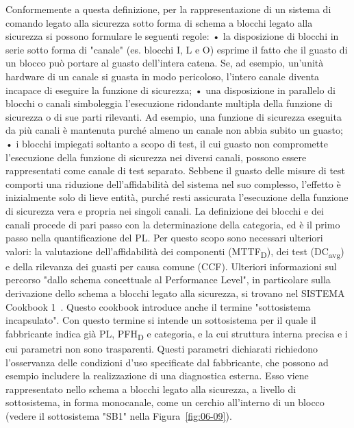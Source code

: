 \begin{center}
    \begin{minipage}{\textwidth}
        \centering
        \captionsetup{hypcap=false}
        \resizebox{0.8\textwidth}{!}{}
        \label{fig:06-09}
    \end{minipage}
\end{center}
Conformemente a questa definizione, per la rappresentazione di un sistema di comando legato alla sicurezza sotto forma di schema a blocchi legato alla sicurezza si possono formulare le seguenti regole:
•	la disposizione di blocchi in serie sotto forma di "canale" (es. blocchi I, L e O) esprime il fatto che il guasto di un blocco può portare al guasto dell'intera catena. Se, ad esempio, un'unità hardware di un canale si guasta in modo pericoloso, l'intero canale diventa incapace di eseguire la funzione di sicurezza;
•	una disposizione in parallelo di blocchi o canali simboleggia l'esecuzione ridondante multipla della funzione di sicurezza o di sue parti rilevanti. Ad esempio, una funzione di sicurezza eseguita da più canali è mantenuta purché almeno un canale non abbia subito un guasto;
•	i blocchi impiegati soltanto a scopo di test, il cui guasto non compromette l'esecuzione della funzione di sicurezza nei diversi canali, possono essere rappresentati come canale di test separato. Sebbene il guasto delle misure di test comporti una riduzione dell'affidabilità del sistema nel suo complesso, l'effetto è inizialmente solo di lieve entità, purché resti assicurata l'esecuzione della funzione di sicurezza vera e propria nei singoli canali.
La definizione dei blocchi e dei canali procede di pari passo con la determinazione della categoria, ed è il primo passo nella quantificazione del PL. Per questo scopo sono necessari ulteriori valori: la valutazione dell'affidabilità dei componenti (MTTF\textsubscript{D}), dei test (DC\textsubscript{avg}) e della rilevanza dei guasti per causa comune (CCF). Ulteriori informazioni sul percorso "dallo schema concettuale al Performance Level", in particolare sulla derivazione dello schema a blocchi legato alla sicurezza, si trovano nel SISTEMA Cookbook 1~\cite{cookbook1}. Questo cookbook introduce anche il termine "sottosistema incapsulato". Con questo termine si intende un sottosistema per il quale il fabbricante indica già PL, PFH\textsubscript{D} e categoria, e la cui struttura interna precisa e i cui parametri non sono trasparenti. Questi parametri dichiarati richiedono l'osservanza delle condizioni d'uso specificate dal fabbricante, che possono ad esempio includere la realizzazione di una diagnostica esterna. Esso viene rappresentato nello schema a blocchi legato alla sicurezza, a livello di sottosistema, in forma monocanale, come un cerchio all'interno di un blocco (vedere il sottosistema "SB1" nella Figura~\ref{fig:06-09}).

